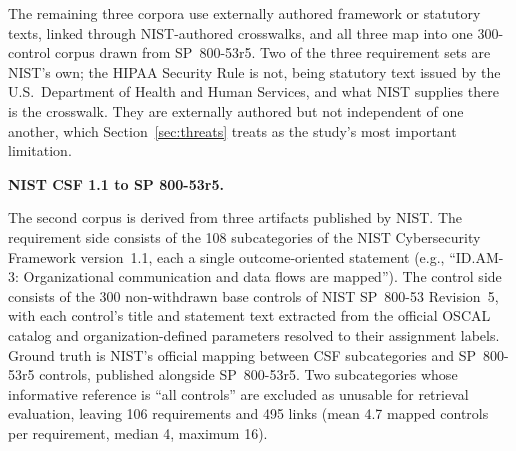 \documentclass[smallextended,natbib]{svjour3}
\begin{document}
The remaining three corpora use externally authored framework or statutory texts, linked through NIST-authored crosswalks, and all three map into one 300-control corpus drawn from SP~800-53r5. Two of the three requirement sets are NIST's own; the HIPAA Security Rule is not, being statutory text issued by the U.S.\ Department of Health and Human Services, and what NIST supplies there is the crosswalk. They are externally authored but not independent of one another, which Section~\ref{sec:threats} treats as the study's most important limitation.

\noindent\textbf{NIST CSF 1.1 to SP 800-53r5.}

The second corpus is derived from three artifacts published by NIST.
The requirement side consists of the 108 subcategories of the NIST Cybersecurity Framework version~1.1, each a single outcome-oriented statement (e.g., ``ID.AM-3: Organizational communication and data flows are mapped'').
The control side consists of the 300 non-withdrawn base controls of NIST SP~800-53 Revision~5, with each control's title and statement text extracted from the official OSCAL catalog and organization-defined parameters resolved to their assignment labels.
Ground truth is NIST's official mapping between CSF subcategories and SP~800-53r5 controls, published alongside SP~800-53r5.
Two subcategories whose informative reference is ``all controls'' are excluded as unusable for retrieval evaluation, leaving 106 requirements and 495 links (mean 4.7 mapped controls per requirement, median 4, maximum 16).
\end{document}
